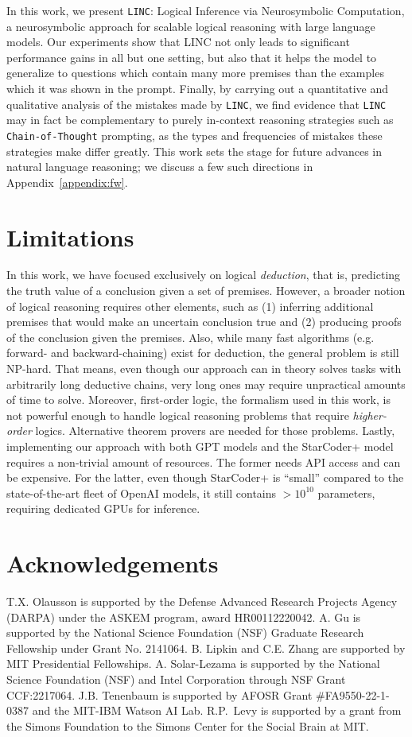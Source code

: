 \documentclass[11pt]{article}
\begin{document}
In this work, we present \texttt{LINC}: Logical Inference via Neurosymbolic Computation, a neurosymbolic approach for scalable logical reasoning with large language models. 
Our experiments show that LINC not only leads to significant performance gains in all but one setting, but also that it helps the model to generalize to questions which contain many more premises than the examples which it was shown in the prompt.
Finally, by carrying out a quantitative and qualitative analysis of the mistakes made by \texttt{LINC}, we find evidence that \texttt{LINC} may in fact be complementary to purely in-context reasoning strategies such as \texttt{Chain-of-Thought} prompting, as the types and frequencies of mistakes these strategies make differ greatly.
This work sets the stage for future advances in natural language reasoning; we discuss a few such directions in Appendix~\ref{appendix:fw}.

\newpage
\section{Limitations}

In this work, we have focused exclusively on logical \emph{deduction}, that is, predicting the truth value of a conclusion given a set of premises.
However, a broader notion of logical reasoning requires other elements, such as (1) inferring additional premises that would make an uncertain conclusion true and (2) producing proofs of the conclusion given the premises. 
Also, while many fast algorithms (e.g. forward- and backward-chaining) exist for deduction, the general problem is still NP-hard. That means, even though our approach can in theory solves tasks with arbitrarily long deductive chains, very long ones may require unpractical amounts of time to solve. Moreover, first-order logic, the formalism used in this work, is not powerful enough to handle logical reasoning problems that require \textit{higher-order} logics. Alternative theorem provers are needed for those problems. Lastly, implementing our approach with both GPT models and the StarCoder+ model requires a non-trivial amount of resources. The former needs API access and can be expensive. For the latter, even though StarCoder+ is ``small'' compared to the state-of-the-art fleet of OpenAI models, it still contains $>10^{10}$ parameters, requiring dedicated GPUs for inference. 

\section{Acknowledgements}
T.X. Olausson is supported by the Defense Advanced Research Projects Agency (DARPA) under the ASKEM program, award HR00112220042.
A. Gu is supported by the National Science Foundation (NSF) Graduate Research Fellowship under Grant No. 2141064. 
B. Lipkin and C.E. Zhang are supported by MIT Presidential Fellowships.
A. Solar-Lezama is supported by the National Science Foundation (NSF) and Intel Corporation through NSF Grant CCF:2217064.
J.B. Tenenbaum is supported by AFOSR Grant \#FA9550-22-1-0387 and the MIT-IBM Watson AI Lab.
R.P.\ Levy is supported by a grant from the Simons Foundation to the Simons Center for the Social Brain at MIT.
\end{document}
